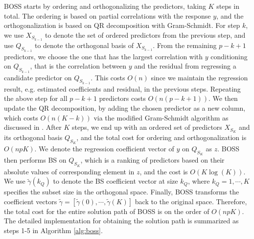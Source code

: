 BOSS starts by ordering and orthogonalizing the predictors, taking $K$ steps in total. The ordering is based on partial correlations with the response $y$, and the orthogonalization is based on QR decomposition with Gram-Schmidt. For step $k$, we use $X_{S_{k-1}}$ to denote the set of ordered predictors from the previous step, and use $Q_{S_{k-1}}$ to denote the orthogonal basis of $X_{S_{k-1}}$. From the remaining $p-k+1$ predictors, we choose the one that has the largest correlation with $y$ conditioning on $Q_{S_{k-1}}$, that is the correlation between $y$ and the residual from regressing a candidate predictor on $Q_{S_{k-1}}$. This costs $O(n)$ since we maintain the regression result, e.g. estimated coefficients and residual, in the previous steps. Repeating the above step for all $p-k+1$ predictors costs $O(n(p-k+1))$. We then update the QR decomposition, by adding the chosen predictor as a new column, which costs $O(n(K-k))$ via the modified Gram-Schmidt algorithm as discussed in \citet{hammarling2008updating}. After $K$ steps, we end up with an ordered set of predictors $X_{S_K}$ and its orthogonal basis $Q_{S_K}$, and the total cost for ordering and orthogonalization is $O(npK)$. We denote the regression coefficient vector of $y$ on $Q_{S_K}$ as $z$. BOSS then performs BS on $Q_{S_K}$, which is a ranking of predictors based on their absolute values of corresponding element in $z$, and the cost is $O(K\log(K))$. We use $\tilde{\gamma}(k_Q)$ to denote the BS coefficient vector at size $k_Q$, where $k_Q=1,\cdots,K$ specifies the subset size in the orthogonal space. Finally, BOSS transforms the coefficient vectors $\tilde{\gamma}=[\tilde{\gamma}(0),\cdots,\tilde{\gamma}(K)]$ back to the original space. Therefore, the total cost for the entire solution path of BOSS is on the order of $O(npK)$. The detailed implementation for obtaining the solution path is summarized as steps 1-5 in Algorithm \ref{alg:boss}.

